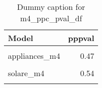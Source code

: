 \begin{table}
\centering
\caption{Dummy caption for m4_ppc_pval_df}
\centering
\fontsize{10}{12}\selectfont
\begin{tabular}[t]{lr}
\toprule
Model & pppval\\
\midrule
\cellcolor{gray!10}{windows\_m4} & \cellcolor{gray!10}{0.45}\\
appliances\_m4 & 0.47\\
\cellcolor{gray!10}{insulation\_m4} & \cellcolor{gray!10}{0.51}\\
solare\_m4 & 0.54\\
\cellcolor{gray!10}{heatpumps\_m4} & \cellcolor{gray!10}{0.47}\\
\bottomrule
\end{tabular}
\end{table}
